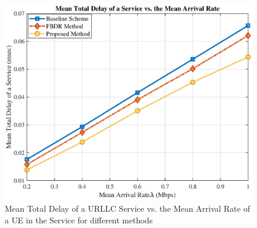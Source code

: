 \documentclass[conference]{IEEEtran}
\begin{document}
\begin{figure}
  \centering 
    \includegraphics[scale = 0.47]{delay1_new.eps}
  \caption{Mean Total Delay of a URLLC Service vs. the Mean Arrival Rate of a UE in the Service for different methods}
  \label{fig:7}
\end{figure}
\end{document}
